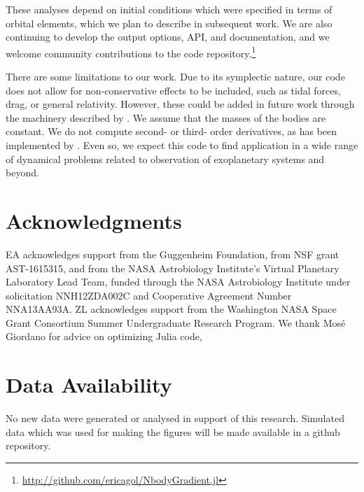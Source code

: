 \documentclass[fleqn,usenatbib,twocolumn]{mnras}
\newcommand   {\change}[1] {{\color{black}{#1}}}
\begin{document}
These analyses depend on initial conditions which were specified in terms of
orbital elements, which we plan to describe in subsequent work.  We are also continuing to develop the output options, API, and documentation, and we welcome community contributions to the code repository.\footnote{\url{http://github.com/ericagol/NbodyGradient.jl}}

There are some limitations to our work.  Due to its symplectic nature, our code does not allow for non-conservative effects to be included, such as tidal forces, drag, or general relativity.  However, these could be added in future work through the machinery described by \citet{Tamayo2020}.  We assume that the masses of the bodies are constant.  We do not compute second- or third- order derivatives, as has been implemented by \citet{Rein2016}.  Even so, we expect this code to find application in a wide range of dynamical problems related to observation of exoplanetary systems and beyond.

\section*{Acknowledgments}

EA acknowledges support from the Guggenheim Foundation, from NSF grant AST-1615315, and from
the NASA Astrobiology Institute's Virtual Planetary Laboratory Lead Team,
funded through the NASA Astrobiology Institute under solicitation NNH12ZDA002C
and Cooperative Agreement Number NNA13AA93A. ZL acknowledges support from the Washington NASA Space Grant Consortium Summer Undergraduate Research Program. We thank Mos\'e Giordano for advice on optimizing Julia code, \change{and we thank Hanno Rein, Dan Tamayo, and the anonymous referee for comments on the submitted version which greatly improved the paper.}

\section*{Data Availability}

No new data were generated or analysed in support of this research.  Simulated data which was used for making the figures will be made available in a github repository.




\appendix

\change{\section{Derivation of {\sc AHL21} Kepler + Drift step} \label{sec:appendix1}}
\end{document}
